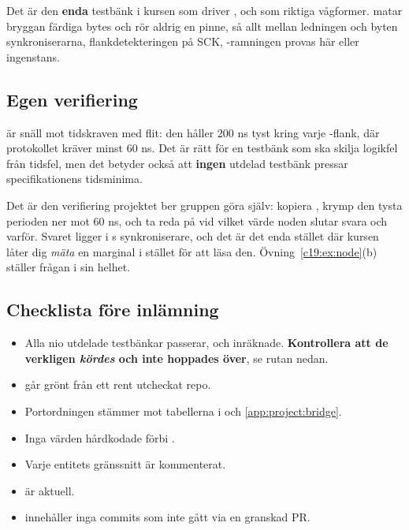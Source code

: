 Det är den \textbf{enda} testbänk i kursen som driver ,  och  som
riktiga vågformer.  matar bryggan färdiga bytes och rör aldrig en pinne, så
allt mellan ledningen och byten \textemdash{} synkroniserarna, flankdetekteringen på SCK,
-ramningen \textemdash{} provas här eller ingenstans.

\subsection{Egen verifiering}
\label{app:project:ownverify}

 är snäll mot tidskraven med flit: den håller 200 ns tyst kring varje
-flank, där protokollet kräver minst 60 ns. Det är rätt för en testbänk som ska skilja
logikfel från tidsfel, men det betyder också att \textbf{ingen} utdelad testbänk pressar
specifikationens tidsminima.

Det är den verifiering projektet ber gruppen göra själv: kopiera , krymp den
tysta perioden ner mot 60 ns, och ta reda på vid vilket värde noden slutar svara och varför. Svaret
ligger i s synkroniserare, och det är det enda stället där kursen låter dig
\emph{mäta} en marginal i stället för att läsa den. Övning~\ref{c19:ex:node}(b) ställer frågan i sin
helhet.

\subsection{Checklista före inlämning}
\label{app:project:checklist}

\begin{itemize}
  \item Alla nio utdelade testbänkar passerar,  och 
    inräknade. \textbf{Kontrollera att de verkligen \emph{kördes} och inte hoppades över}, se rutan
    nedan.
  \item {} går grönt från ett rent utcheckat repo.
  \item Portordningen stämmer mot tabellerna i  och
    \ref{app:project:bridge}.
  \item Inga värden hårdkodade förbi .
  \item Varje entitets gränssnitt är kommenterat.
  \item {} är aktuell.
  \item {} innehåller inga commits som inte gått via en granskad PR.
\end{itemize}

